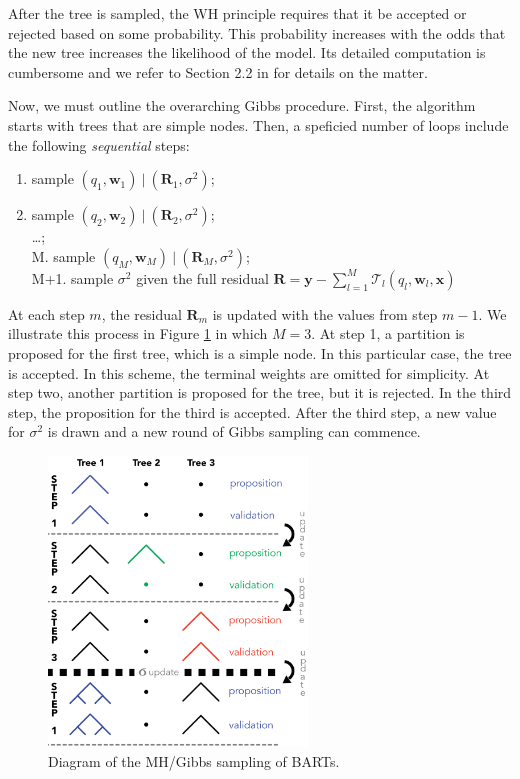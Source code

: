 \documentclass[]{krantz}
\providecommand{\tightlist}{%
  \setlength{\itemsep}{0pt}\setlength{\parskip}{0pt}}
\theoremstyle{definition}
\theoremstyle{definition}
\theoremstyle{definition}
\theoremstyle{remark}
\begin{document}
After the tree is sampled, the WH principle requires that it be accepted
or rejected based on some probability. This probability increases with
the odds that the new tree increases the likelihood of the model. Its
detailed computation is cumbersome and we refer to Section 2.2 in
\citet{sparapani2019r} for details on the matter.

Now, we must outline the overarching Gibbs procedure. First, the
algorithm starts with trees that are simple nodes. Then, a speficied
number of loops include the following \emph{sequential} steps:

\begin{enumerate}
\def\labelenumi{\arabic{enumi}.}
\tightlist
\item
  sample \((q_1,\textbf{w}_1) \ | \ (\textbf{R}_{1},\sigma^2 )\);\\
\item
  sample \((q_2,\textbf{w}_2) \ | \ (\textbf{R}_{2},\sigma^2 )\);\\
  \ldots{};\\
  M. sample \((q_M,\textbf{w}_M) \ | \ (\textbf{R}_{M},\sigma^2 )\);\\
  M+1. sample \(\sigma^2\) given the full residual
  \(\textbf{R}=\textbf{y}-\sum_{l=1}^M\mathcal{T}_l(q_l,\textbf{w}_l, \textbf{x})\)
\end{enumerate}

At each step \(m\), the residual \(\textbf{R}_{m}\) is updated with the
values from step \(m-1\). We illustrate this process in Figure
\ref{fig:bartfig} in which \(M=3\). At step 1, a partition is proposed
for the first tree, which is a simple node. In this particular case, the
tree is accepted. In this scheme, the terminal weights are omitted for
simplicity. At step two, another partition is proposed for the tree, but
it is rejected. In the third step, the proposition for the third is
accepted. After the third step, a new value for \(\sigma^2\) is drawn
and a new round of Gibbs sampling can commence.

\begin{figure}[b]

{\centering \includegraphics[width=260px]{images/bart} 

}

\caption{Diagram of the MH/Gibbs sampling of BARTs.}\label{fig:bartfig}
\end{figure}
\end{document}
